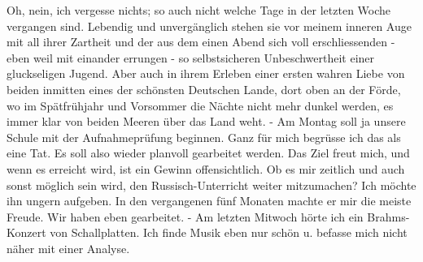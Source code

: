\def\day{22. Mai 1943}
\mktitle

Oh, nein, ich vergesse nichts; so auch nicht welche Tage in der letzten Woche vergangen sind.
Lebendig und unverg\"{a}nglich stehen sie vor meinem inneren Auge mit all ihrer Zartheit und der aus dem einen Abend sich voll erschliessenden - eben weil mit einander errungen - so selbstsicheren Unbeschwertheit einer gluckseligen Jugend.
Aber auch in ihrem Erleben einer ersten wahren Liebe von beiden inmitten eines der sch\"{o}nsten Deutschen Lande, dort oben an der F\"{o}rde, wo im Sp\"{a}tfr\"{u}hjahr und Vorsommer die N\"{a}chte nicht mehr dunkel werden, es immer klar von beiden Meeren \"{u}ber das Land weht.
- Am Montag soll ja unsere Schule mit der Aufnahmepr\"{u}fung beginnen.
Ganz f\"{u}r mich begr\"{u}sse ich das als eine Tat.
Es soll also wieder planvoll gearbeitet werden.
Das Ziel freut mich, und wenn es erreicht wird, ist ein Gewinn offensichtlich.
Ob es mir zeitlich und auch sonst m\"{o}glich sein wird, den Russisch-Unterricht weiter mitzumachen?
Ich m\"{o}chte ihn ungern aufgeben.
In den vergangenen f\"{u}nf Monaten machte er mir die meiste Freude.
Wir haben eben gearbeitet.
- Am letzten Mitwoch h\"{o}rte ich ein Brahms-Konzert von Schallplatten.
Ich finde Musik eben nur sch\"{o}n u. befasse mich nicht n\"{a}her mit einer Analyse.

\clearpage
